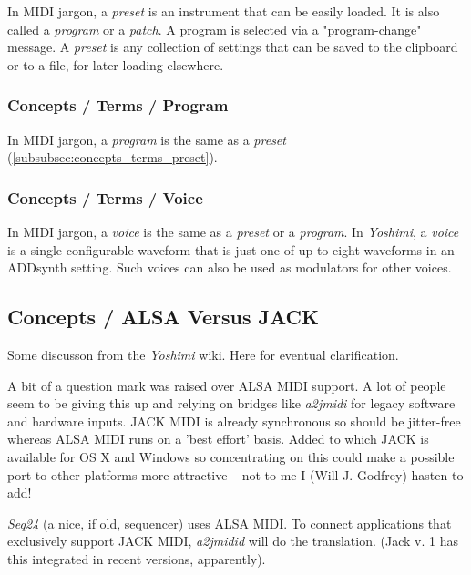    In MIDI jargon, a \textsl{preset} is an instrument that can be easily
   loaded.  It is also called a \textsl{program} or a \textsl{patch}.  A
   program is selected via a "program-change" message.  A
   \textsl{preset} is any collection of settings that can be saved to the
   clipboard or to a file, for later loading elsewhere.

\subsubsection{Concepts / Terms / Program}
\label{subsubsec:concepts_terms_program}

   In MIDI jargon, a \textsl{program} is the same as a \textsl{preset}
   (\ref{subsubsec:concepts_terms_preset}).

\subsubsection{Concepts / Terms / Voice}
\label{subsubsec:concepts_terms_voice}

   In MIDI jargon, a \textsl{voice} is the same as
   a \textsl{preset} or a \textsl{program}.
   In \textsl{Yoshimi}, a \textsl{voice} is a single configurable waveform
   that is just one of up to eight waveforms in an ADDsynth setting.
   Such voices can also be used as modulators for other voices.

\subsection{Concepts / ALSA Versus JACK}
\label{subsec:concepts_alsa_versus_jack}

   Some discusson from the \textsl{Yoshimi} wiki.  Here for eventual
   clarification.

   A bit of a question mark was raised over ALSA MIDI support. A lot of
   people seem to be giving this up and relying on bridges like
   \textsl{a2jmidi} for legacy software and hardware inputs. JACK MIDI is
   already synchronous so should be jitter-free whereas ALSA MIDI runs on a
   'best effort' basis. Added to which JACK is available for OS X and
   Windows so concentrating on this could make a possible port to other
   platforms more attractive -- not to me I (Will J. Godfrey) hasten to add!

   \textsl{Seq24} (a nice, if old, sequencer) uses ALSA MIDI. To connect
   applications that exclusively support JACK MIDI, \textsl{a2jmidid} will
   do the translation.  (Jack v. 1 has this integrated in recent versions,
   apparently).

